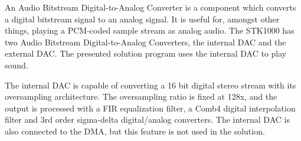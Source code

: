 An Audio Bitstream Digital-to-Analog Converter is a component which converts a digital bitstream signal to an analog signal.
It is useful for, amongst other things, playing a PCM-coded sample stream as analog audio.
The STK1000 has two Audio Bitstream Digital-to-Analog Converters, the internal DAC and the external DAC.
The presented solution program uses the internal DAC to play sound.

The internal DAC is capable of converting a 16 bit digital stereo stream with its oversampling architecture. The oversampling ratio is fixed at 128x, and the output is processed with a FIR equalization filter, a Comb4 digital interpolation filter and 3rd order sigma-delta digital/analog converters\cite{ap7000-prelim}.
The internal DAC is also connected to the DMA, but this feature is not used in the solution.
